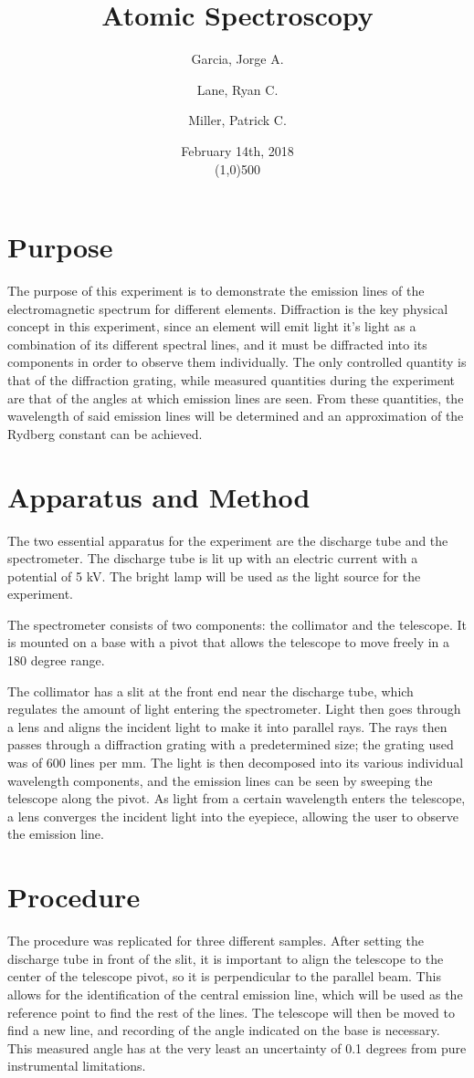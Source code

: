 \documentclass[a4paper, twocolumn]{article}
\title{Atomic Spectroscopy}
\author{
Garcia, Jorge A.\\
\and
Lane, Ryan C. \\
\and
Miller, Patrick C.
}
\date{February 14th, 2018\\\line(1,0){500}}
\begin{document}
\maketitle

\section{Purpose}
The purpose of this experiment is to demonstrate the emission lines of the electromagnetic spectrum for different elements.
Diffraction is the key physical concept in this experiment, since an element will emit light it's light as a combination of
its different spectral lines, and it must be diffracted into its components in order to observe them individually. The only
controlled quantity is that of the diffraction grating, while measured quantities during the experiment are that of the 
angles at which emission lines are seen. From these quantities, the wavelength of said emission lines will be determined and
an approximation of the Rydberg constant can be achieved.

\section{Apparatus and Method}
The two essential apparatus for the experiment are the discharge tube and the spectrometer. The discharge tube is lit up with an
electric current with a potential of 5 kV. The bright lamp will be used as the light source for the experiment.

The spectrometer consists of two components: the collimator and the telescope. It is mounted on a base with a pivot that allows
the telescope to move freely in a 180 degree range.

The collimator has a slit at the front end near the discharge tube, which regulates the amount of light entering the spectrometer.
Light then goes through a lens and aligns the incident light to make it into parallel rays. The rays then passes through a
diffraction grating with a predetermined size; the grating used was of 600 lines per mm. The light is then decomposed into its
various individual wavelength components, and the emission lines can be seen by sweeping the telescope along the pivot. As light from
a certain wavelength enters the telescope, a lens converges the incident light into the eyepiece, allowing the user to observe the
emission line.

\section{Procedure}
The procedure was replicated for three different samples. After setting the discharge tube in front of the slit, it is important
to align the telescope to the center of the telescope pivot, so it is perpendicular to the parallel beam. This allows for the 
identification of the central emission line, which will be used as the reference point to find the rest of the lines. The telescope
will then be moved to find a new line, and recording of the angle indicated on the base is necessary. This measured angle has
at the very least an uncertainty of 0.1 degrees from pure instrumental limitations.
\end{document}

